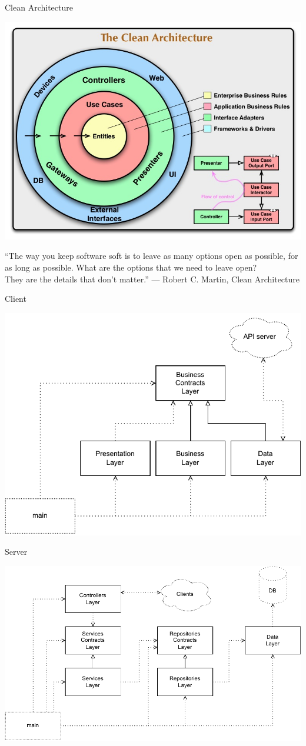 \documentclass[czech,aspectratio=169]{beamer}
\begin{document}
  \begin{frame}{Clean Architecture}
    \begin{center}
      \includegraphics[width=.4\textwidth]{assets/slides/logo-clean-architecture}
    \end{center}
      \begin{center}
        {\large ``The way you keep software soft is
      to leave as many options open as possible,
      for as long as possible.
      What are the options that we need to leave open?\\
      They are the details
      that don’t matter.''}
      \vskip5mm
      --- Robert C. Martin, Clean Architecture
      \end{center}
  \end{frame}

  \begin{frame}{Client}
    \begin{center}
      \includegraphics[width=.57\textwidth]{assets/slides/clientarchitecture}
    \end{center}
  \end{frame}

  \begin{frame}{Server}
    \begin{center}
      \includegraphics[width=.7\textwidth]{assets/slides/serverarchitecture}
    \end{center}
  \end{frame}
\end{document}
